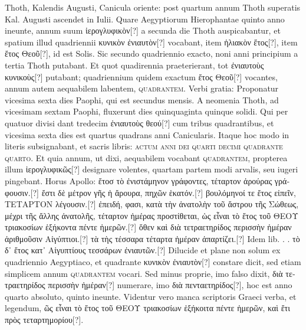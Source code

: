 Thoth, Kalendis Augusti, Canicula oriente: post quartum annum
Thoth superatis Kal. Augusti ascendet in  Iulii.
Quare Aegyptiorum
Hierophantae quinto anno ineunte, annum suum \textgreek{ἱερογλυφικὸν}[?]
a secunda die Thoth auspicabantur, et spatium illud quadriennii
\textgreek{κυνικὸν ἐνιαυτὸν}[?] vocabant, item \textgreek{ἡλιακὸν ἔτος}[?],
 item \textgreek{ἔτος Θεοῦ}[?], id
est Solis.
Sic secundo quadriennio exacto, noni anni principium a
tertia Thoth putabant.
Et quot quadirennia praeterierant, tot \textgreek{ἐνιαυτοὺς
κυνικοὺς}[?] putabant; quadriennium quidem exactum
 \textgreek{ἔτος Θεοῦ}[?] vocantes,
annum autem aequabilem labentem, \textsc{quadrantem}.
Verbi
gratia: Proponatur vicesima sexta dies Paophi, qui est secundus
mensis.
%
A neomenia Thoth, ad vicesimam sextam Paophi, fluxerunt
dies quinquaginta quinque solidi.
Qui per quatuor divisi
dant tredecim \textgreek{ἐνιαυτοὺς θεού}[?] cum tribus quadrantibus, et vicesima
sexta dies est quartus quadrans anni  Canicularis.
Itaque hoc
modo in literis subsignabant, et sacris libris: \textsc{actum anni
dei quarti decimi quadrante quarto}.
Et quia
annum, ut dixi, aequabilem vocabant \textsc{quadrantem}, propterea
illum \textgreek{ἱερογλυφικῶς}[?] designare volentes,
 quartam partem modi arvalis,
seu iugeri pingebant.
Horus Apollo: \textgreek{ἔτοσ τὸ ἐνιστάμηνον γράφοντες,
τέταρτον ἀρούρας γράφουσιν.}[?]
\textgreek{ἔστι δὲ μέτρον γῆς ἡ ἄρουρα, πηχῶν
ἑκατόν.}[?]
\textgreek{βουλόμηνοί τε ἔτος εἰπεῖν, ΤΕΤΑΡΤΟΝ λέγουσιν.}[?]
\textgreek{ἐπειδή,
φασι, κατὰ τὴν ἀνατολὴν τοῦ ἄστρου τῆς Σώθεως, μέχρι τῆς ἄλλης ἀνατολῆς,
τέταρτον ἡμέρας προστίθεται, ὡς εἶναι τὸ ἔτος τοῦ ΘΕΟΥ τριακοσίων
ἑξήκοντα πέντε ἡμερῶν.}[?]
\textgreek{ὅθεν καὶ διὰ τετραετηρίδος περισσὴν ἡμέραν ἀριθμοῦσιν
Αἰγύπτιοι.}[?]
\textgreek{τὰ τὴς τέσσαρα τέταρτα ἡμέραν ἀπαρτίζει.}[?]
Idem lib.
. .
\textgreek{τὸ δ᾽ ἔτος κατ᾽ Αἰγυπτίους τεσσάρων ἐνιαυτῶν.}[?]
Dilucide et
plane non solum ex quadriennio Aegyptiaco, et quadrante \textgreek{κυνικὸν
ἐνιαυτὸν}[?] constare dicit, sed etiam simplicem annum \textsc{quadrantem}
vocari.
Sed minus proprie, imo falso dixit, \textgreek{διὰ
τετραετηρίδος περισσὴν ἡμέραν}[?] numerare, imo \textgreek{διὰ πενταετηρίδος}[?], hoc
est anno quarto absoluto, quinto ineunte.
Videntur vero manca scriptoris
Graeci verba, et legendum, \textgreek{ῶς εἶναι τὸ ἔτος τοῦ ΘΕΟΥ τριακοσίων
ἑξήκοιτα πέντε ἡμερῶν, καὶ ἔτι πρὸς τεταρτημορίου}[?].
